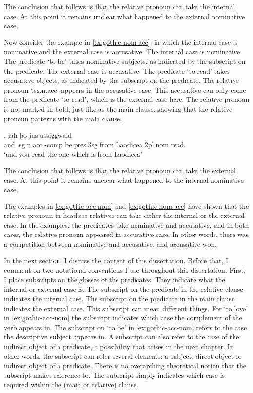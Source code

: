 The conclusion that follows is that the relative pronoun can take the internal case. At this point it remains unclear what happened to the external nominative case.

Now consider the example in \ref{ex:gothic-nom-acc}, in which the internal case is nominative and the external case is accusative.
The internal case is nominative. The predicate  `to be' takes nominative subjects, as indicated by the subscript on the predicate.
The external case is accusative. The predicate  `to read' takes accusative objects, as indicated by the subscript on the predicate.
The relative pronoun  `.\ac{sg}.\ac{n}.\ac{acc}' appears in the accusative case. This accusative can only come from the predicate  `to read', which is the external case here. The relative pronoun is not marked in bold, just like as the main clause, showing that the relative pronoun patterns with the main clause.

\exg. jah þo     jus ussiggwaid\\
 and .\ac{sg}.\ac{n}.\ac{acc} -\ac{comp} be.\ac{pres}.3\ac{sg}\scsub{[nom]} from Laodicea 2\ac{pl}.\ac{nom} read.\scsub{[acc]}\\
 `and you read the one which is from Laodicea' \label{ex:gothic-nom-acc}

The conclusion that follows is that the relative pronoun can take the external case. At this point it remains unclear what happened to the internal nominative case.

The examples in \ref{ex:gothic-acc-nom} and \ref{ex:gothic-nom-acc} have shown that the relative pronoun in headless relatives can take either the internal or the external case. In the examples, the predicates take nominative and accusative, and in both cases, the relative pronoun appeared in accusative case. In other words, there was a competition between nominative and accusative, and accusative won.

In the next section, I discuss the content of this dissertation. Before that, I comment on two notational conventions I use throughout this dissertation. First, I place subscripts on the glosses of the predicates. They indicate what the internal or external case is. The subscript on the predicate in the relative clause indicates the internal case. The subscript on the predicate in the main clause indicates the external case. This subscript can mean different things.
For  `to love' in \ref{ex:gothic-acc-nom} the subscript indicates which case the complement of the verb appears in. The subscript on  `to be' in \ref{ex:gothic-acc-nom} refers to the case the descriptive subject appears in. A subscript can also refer to the case of the indirect object of a predicate, a possibility that arises in the next chapter.
In other words, the subscript can refer several elements: a subject, direct object or indirect object of a predicate. There is no overarching theoretical notion that the subscript makes reference to. The subscript simply indicates which case is required within the (main or relative) clause.

